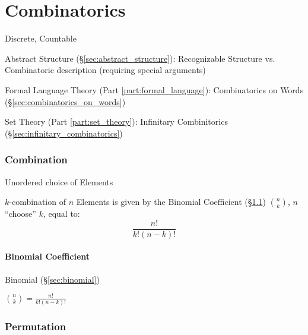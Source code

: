 \part{Combinatorics}\label{part:combinatorics}

Discrete, Countable

Abstract Structure (\S\ref{sec:abstract_structure}): Recognizable
Structure vs. Combinatoric description (requiring special arguments)

Formal Language Theory (Part \ref{part:formal_language}):
Combinatorics on Words (\S\ref{sec:combinatorics_on_words})

Set Theory (Part \ref{part:set_theory}): Infinitary Combinitorics
(\S\ref{sec:infinitary_combinatorics})



\section{Combination}\label{sec:combination}

Unordered choice of Elements

$k$-combination of $n$ Elements is given by the Binomial Coefficient
(\S\ref{sec:binomial_coefficient}) $\binom{n}{k}$, $n$ ``choose'' $k$,
equal to:
\[
  \frac{n!}{k!(n - k)!}
\]



\subsection{Binomial Coefficient}\label{sec:binomial_coefficient}

Binomial (\S\ref{sec:binomial})

$\binom{n}{k} = \frac{n!}{k!(n - k)!}$



\section{Permutation}\label{sec:permutation}

